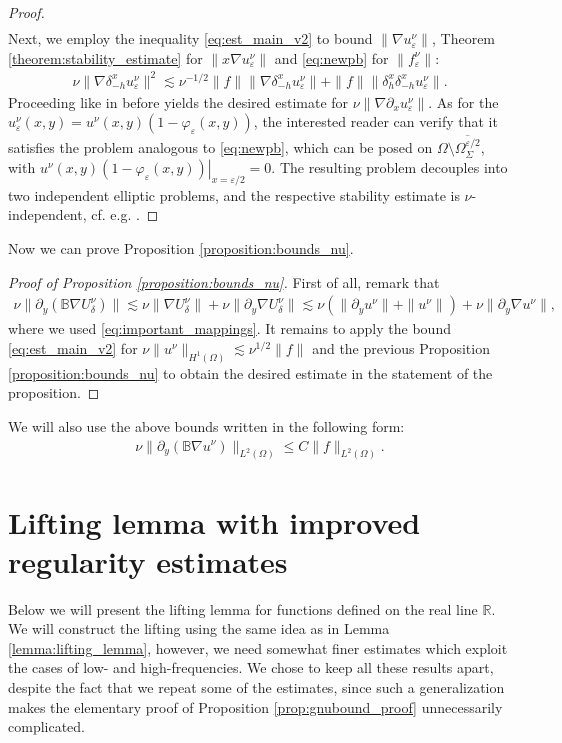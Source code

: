 \documentclass[report]{elsarticle}
\numberwithin{theorem}{section}
\newcommand{\re}{\varepsilon}
\begin{document}
\begin{proof}
\begin{align*}
	\end{align*}
	Next, we employ the inequality \eqref{eq:est_main_v2} to bound $\|\nabla u^{\nu}_{\re}\|$, Theorem \ref{theorem:stability_estimate} for $\|x\nabla u^{\nu}_{\varepsilon}\|$ and \eqref{eq:newpb} for $\|f^{\nu}_{\re}\|$:
	\begin{align*}
		\nu\|\nabla \delta_{-h}^xu^{\nu}_{\varepsilon}\|^2\lesssim \nu^{-1/2}\|f\|\|\nabla \delta_{-h}^xu^{\nu}_{\varepsilon}\|+\|f\|\|\delta_{h}^x\delta_{-h}^xu^{\nu}_{\varepsilon}\|.
	\end{align*}
	Proceeding like in before yields the desired estimate for $\nu\|\nabla \partial_x u^{\nu}_{\varepsilon}\|$. As for the $u^{\nu}_{\varepsilon}(x,y)=u^{\nu}(x,y)(1-\varphi_{\varepsilon}(x,y))$, the interested reader can verify that it satisfies the problem analogous to \eqref{eq:newpb}, which can be posed on $\Omega\setminus \overline{\Omega_{\Sigma}^{\varepsilon/2}}$, with $\left.u^{\nu}(x,y)(1-\varphi_{\varepsilon}(x,y))\right|_{x=\varepsilon/2}=0$. The resulting problem decouples into two independent elliptic  problems, and the respective stability estimate is $\nu$-independent, cf. e.g. \cite[pp. 133-141]{mclean}. 
\end{proof}
Now we can prove Proposition \ref{proposition:bounds_nu}. 
\begin{proof}[Proof of Proposition \ref{proposition:bounds_nu}]
	First of all, remark that 
	\begin{align*}
		\nu\| \partial_y(\mathbb{B}\nabla U^{\nu}_{\delta})\|\lesssim \nu\|\nabla U^{\nu}_{\delta}\|+\nu\|\partial_y \nabla U^{\nu}_{\delta}\|\lesssim \nu(\|\partial_y u^{\nu}\|+\|u^{\nu}\|)+\nu\|\partial_y \nabla u^{\nu}\|,
	\end{align*}
	where we used \eqref{eq:important_mappings}. It remains to apply the bound \eqref{eq:est_main_v2} for $\nu\|u^{\nu}\|_{H^1(\Omega)}\lesssim \nu^{1/2}\|f\|$ and the previous Proposition \ref{proposition:bounds_nu} to obtain the desired estimate in the statement of the proposition.  
\end{proof}
We will also use the above bounds written in the following form:
\begin{align}
	\label{eq:unubtmp2}
	\nu\|\partial_y(\mathbb{B}\nabla u^{\nu})\|_{L^2(\Omega)}\leq C\|f\|_{L^2(\Omega)}.
\end{align}

\section{Lifting lemma with improved regularity estimates}
\label{appendix:lifting_lemmas}
Below we will present the lifting lemma for functions defined on the real line $\mathbb{R}$. 
We will construct the lifting using the same idea as in Lemma \ref{lemma:lifting_lemma}, however, we need somewhat finer estimates which exploit the cases of low- and high-frequencies. We chose to keep all these results apart, despite the fact that we repeat some of the estimates, since such a generalization makes the elementary proof of Proposition \ref{prop:gnubound_proof} unnecessarily complicated.
\end{document}
